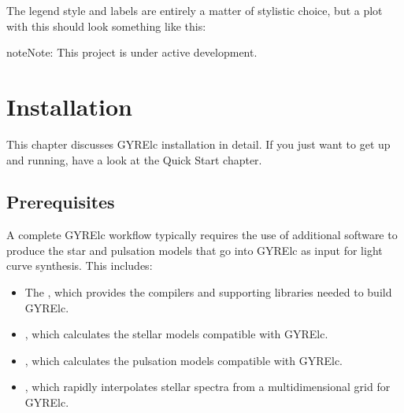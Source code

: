 \documentclass[letterpaper,10pt,english]{sphinxmanual}
\begin{document}
\sphinxAtStartPar
The legend style and labels are entirely a matter of stylistic choice, but a plot with this  should look something like this:

\noindent{}

\begin{sphinxadmonition}{note}{Note:}
\sphinxAtStartPar
This project is under active development.
\end{sphinxadmonition}

\sphinxAtStartPar



\chapter{Installation}
\label{\detokenize{ref-guide/installation:installation}}\label{\detokenize{ref-guide/installation::doc}}
\sphinxAtStartPar
This chapter discusses GYRE\sphinxhyphen{}lc installation in detail. If you just want to get up and running, have a look at the Quick Start chapter.


\section{Prerequisites}
\label{\detokenize{ref-guide/installation:prerequisites}}
\sphinxAtStartPar
A complete GYRE\sphinxhyphen{}lc workflow typically requires the use of additional software to produce the star and pulsation models that go into GYRE\sphinxhyphen{}lc as input for light curve synthesis. This includes:
\begin{itemize}
\item {} 
\sphinxAtStartPar
The , which provides the compilers and supporting libraries needed to build GYRE\sphinxhyphen{}lc.

\item {} 
\sphinxAtStartPar
{}, which calculates the stellar models compatible with GYRE\sphinxhyphen{}lc.

\item {} 
\sphinxAtStartPar
{}, which calculates the pulsation models compatible with GYRE\sphinxhyphen{}lc.

\item {} 
\sphinxAtStartPar
{}, which rapidly interpolates stellar spectra from a multidimensional grid for GYRE\sphinxhyphen{}lc.

\end{itemize}
\end{document}

